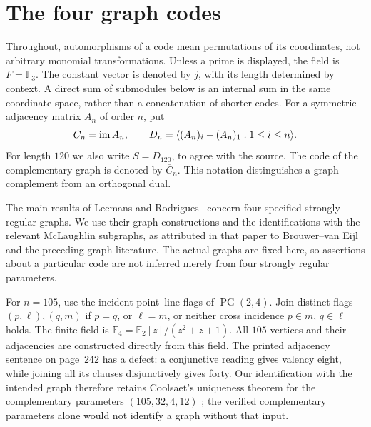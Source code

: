 \section{The four graph codes}

Throughout, automorphisms of a code mean permutations of its coordinates,
not arbitrary monomial transformations. Unless a prime is displayed, the
field is $F=\mathbb F_3$. The constant vector is denoted by $j$, with its
length determined by context. A direct sum of submodules below is an
internal sum in the same coordinate space, rather than a concatenation of
shorter codes. For a symmetric adjacency matrix $A_n$ of order $n$, put
\[
 C_n=\operatorname{im} A_n,\qquad
 D_n=\langle (A_n)_i-(A_n)_1:1\leq i\leq n\rangle.
\]
For length $120$ we also write $S=D_{120}$, to agree with the source.
The code of the complementary graph is denoted by $\overline C_n$.
This notation distinguishes a graph complement from an orthogonal dual.

The main results of Leemans and Rodrigues~\cite{LR} concern four specified
strongly regular graphs. We use their graph constructions and the
identifications with the relevant McLaughlin subgraphs, as attributed in
that paper to Brouwer--van Eijl and the preceding graph literature.
The actual graphs are fixed here, so assertions about a particular code
are not inferred merely from four strongly regular parameters.

For $n=105$, use the incident point--line flags of $\operatorname{PG}(2,4)$.
Join distinct flags $(p,\ell),(q,m)$ if $p=q$, or $\ell=m$, or neither
cross incidence $p\in m$, $q\in\ell$ holds. The finite field is
$\mathbb F_4=\mathbb F_2[z]/(z^2+z+1)$. All $105$ vertices and their
adjacencies are constructed directly from this field. The printed
adjacency sentence on page~242 has a defect: a conjunctive reading gives
valency eight, while joining all its clauses disjunctively gives forty.
Our identification with the intended graph therefore retains Coolsaet's
uniqueness theorem for the complementary parameters $(105,32,4,12)$
\cite[Theorem~3]{Coolsaet}; the verified complementary parameters alone
would not identify a graph without that input.

